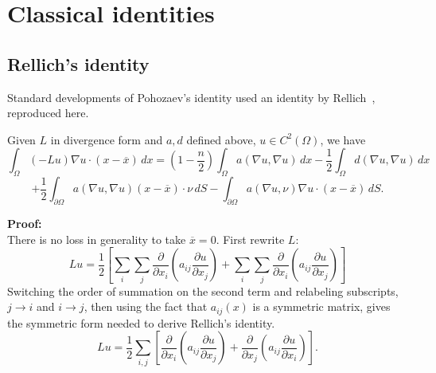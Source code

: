 \chapter{Classical identities}\label{appendix}
\fixchapterheading
\section*{Rellich's identity}\label{rellich.section}
\setcounter{thrm}{0}
%
%

Standard developments of Pohozaev's identity used an identity by
Rellich~\cite{rellich:der40}, reproduced here.

\begin{lem}[Rellich]
Given $L$ in divergence form and $a,d$ defined above, $u\in C^2
(\Omega )$, we have
\begin{equation}\label{rellich}
\int_{\Omega}(-Lu)\nabla u\cdot (x-\overline{x})\, dx
= (1-\frac{n}{2}) \int_{\Omega} a(\nabla u,\nabla u) \, dx
-
\frac{1}{2} \int_{\Omega}
d(\nabla u, \nabla u) \, dx
\end{equation}
$$
+
\frac{1}{2} \int_{\partial\Omega} a(\nabla u,\nabla u)(x-\overline{x})
\cdot \nu  \, dS
-
\int_{\partial\Omega}
a(\nabla u,\nu )\nabla u\cdot (x-\overline{x}) \, dS.
$$
\end{lem}
{\bf Proof:}\\
There is no loss in generality to take $\overline{x} = 0$. First
rewrite $L$:
$$Lu = \frac{1}{2}\left[ \sum_{i}\sum_{j}
\frac{\partial}{\partial x_i}
\left( a_{ij} \frac{\partial u}{\partial x_j} \right) +
\sum_{i}\sum_{j}
\frac{\partial}{\partial x_i}
\left( a_{ij} \frac{\partial u}{\partial x_j} \right)
\right]$$
Switching the order of summation on the second term and relabeling
subscripts, $j \rightarrow i$ and $i \rightarrow j$, then using the fact
that $a_{ij}(x)$ is a symmetric matrix,
gives the symmetric form needed to derive Rellich's identity.
\begin{equation}
Lu = \frac{1}{2} \sum_{i,j}\left[
\frac{\partial}{\partial x_i}
\left( a_{ij} \frac{\partial u}{\partial x_j} \right) +
\frac{\partial}{\partial x_j}
\left( a_{ij} \frac{\partial u}{\partial x_i} \right)
\right].
\end{equation}


